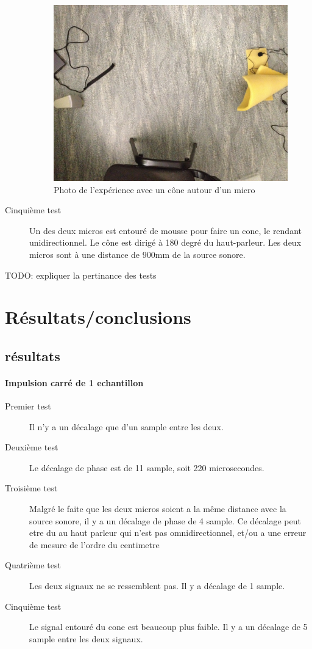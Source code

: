 \documentclass[12pt,a4paper]{report}
\begin{document}
\begin{description}
	\begin{figure}[H]
	\includegraphics[width=\textwidth]{../donnees11-03/test_4.jpg} 
	\caption{Photo de l'expérience avec un cône autour d'un micro}
	\end{figure}
\item[Cinquième test]	Un des deux micros est entouré de mousse pour faire un cone, le rendant unidirectionnel. Le cône est dirigé à 180 degré du haut-parleur. Les deux micros sont à une distance de 900mm de la source sonore.
\end{description}

\begin{huge}
TODO: expliquer la pertinance des tests
\end{huge}

\section{Résultats/conclusions}
\subsection{résultats}
\paragraph{Impulsion carré de 1 echantillon}
\begin{description}
\item[Premier test] Il n'y a un décalage que d'un sample entre les deux.
\item[Deuxième test] Le décalage de phase est de 11 sample, soit 220 microsecondes.
\item[Troisième test] Malgré le faite que les deux micros soient a la même distance avec la source sonore, il y a un décalage de phase de 4 sample. Ce décalage peut etre du au haut parleur qui n'est pas omnidirectionnel, et/ou a une erreur de mesure de l'ordre du centimetre
\item[Quatrième test] Les deux signaux ne se ressemblent pas. Il y a décalage de 1 sample.
\item[Cinquième test] Le signal entouré du cone est beaucoup plus faible. Il y a un décalage de 5 sample entre les deux signaux.
\end{description}
\end{document}
